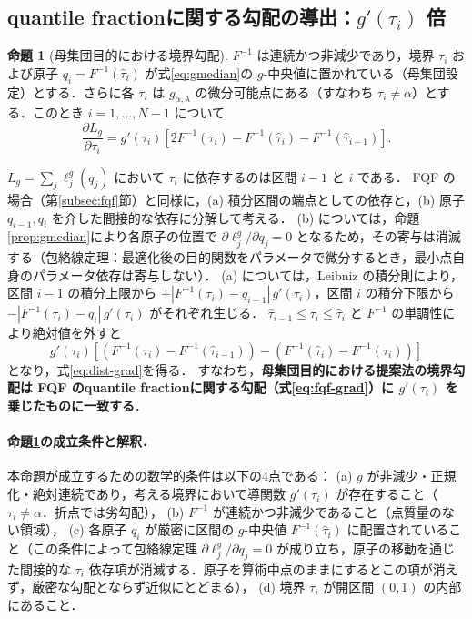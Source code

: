 \documentclass[a4paper,10pt]{jsarticle}
\makeatletter
\theoremstyle{definition}
\newtheorem{proposition}{命題}[section]
\renewenvironment{proof}[1][\proofname]{\par
  \pushQED{\qed}%
  \normalfont \topsep6\p@\@plus6\p@\relax
  \trivlist
  \item[\hskip\labelsep\textbf{#1}]\ignorespaces
}{%
  \popQED\endtrivlist\@endpefalse
}
\renewcommand{\proofname}{証明}
\newcommand{\Finv}{F^{-1}}
\makeatother
\begin{document}
\subsection{quantile fractionに関する勾配の導出：$g'(\tau_i)$ 倍}
\begin{proposition}[母集団目的における境界勾配]
\label{prop:grad}
$\Finv$ は連続かつ非減少であり，境界 $\tau_i$ および原子 $q_i=\Finv(\hat\tau_i)$ が式\eqref{eq:gmedian}の $g$-中央値に置かれている（母集団設定）とする．さらに各 $\tau_i$ は $g_{\alpha,\lambda}$ の微分可能点にある（すなわち $\tau_i\ne\alpha$）とする．このとき $i=1,\dots,N-1$ について
\begin{equation}
  \frac{\partial L_g}{\partial\tau_i}=g'(\tau_i)\left[2\Finv(\tau_i)-\Finv(\hat\tau_i)-\Finv(\hat\tau_{i-1})\right].
  \label{eq:dist-grad}
\end{equation}
\end{proposition}
\begin{proof}
$L_g=\sum_j\ell_j^g(q_j)$ において $\tau_i$ に依存するのは区間 $i-1$ と $i$ である．
FQF の場合（第\ref{subsec:fqf}節）と同様に，(a) 積分区間の端点としての依存と，(b) 原子 $q_{i-1},q_i$ を介した間接的な依存に分解して考える．
(b) については，命題\ref{prop:gmedian}により各原子の位置で $\partial\ell^g_j/\partial q_j=0$ となるため，その寄与は消滅する（包絡線定理：最適化後の目的関数をパラメータで微分するとき，最小点自身のパラメータ依存は寄与しない）．
(a) については，Leibniz の積分則により，区間 $i-1$ の積分上限から $+|\Finv(\tau_i)-q_{i-1}|\,g'(\tau_i)$，区間 $i$ の積分下限から $-|\Finv(\tau_i)-q_i|\,g'(\tau_i)$ がそれぞれ生じる．
$\hat\tau_{i-1}\le\tau_i\le\hat\tau_i$ と $\Finv$ の単調性により絶対値を外すと
\begin{equation*}
  g'(\tau_i)\left[\left(\Finv(\tau_i)-\Finv(\hat\tau_{i-1})\right)-\left(\Finv(\hat\tau_i)-\Finv(\tau_i)\right)\right]
\end{equation*}
となり，式\eqref{eq:dist-grad}を得る．
\end{proof}
すなわち，\textbf{母集団目的における提案法の境界勾配は FQF のquantile fractionに関する勾配（式\eqref{eq:fqf-grad}）に $g'(\tau_i)$ を乗じたものに一致する}．

\paragraph{命題\ref{prop:grad}の成立条件と解釈．}
本命題が成立するための数学的条件は以下の4点である：
(a) $g$ が非減少・正規化・絶対連続であり，考える境界において導関数 $g'(\tau_i)$ が存在すること（$\tau_i\ne\alpha$．折点では劣勾配），
(b) $\Finv$ が連続かつ非減少であること（点質量のない領域），
(c) 各原子 $q_i$ が厳密に区間の $g$-中央値 $\Finv(\hat\tau_i)$ に配置されていること（この条件によって包絡線定理 $\partial\ell_j^g/\partial q_j=0$ が成り立ち，原子の移動を通じた間接的な $\tau_i$ 依存項が消滅する．原子を算術中点のままにするとこの項が消えず，厳密な勾配とならず近似にとどまる），
(d) 境界 $\tau_i$ が開区間 $(0,1)$ の内部にあること．
\end{document}
